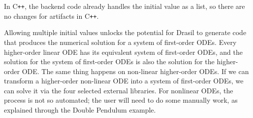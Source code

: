 In C\texttt{++}, the backend code already handles the initial value as a list, so there are no changes for artifacts in C\texttt{++}.




Allowing multiple initial values unlocks the potential for Drasil to generate code that produces the numerical solution for a system of first-order ODEs. Every higher-order linear ODE has its equivalent system of first-order ODEs, and the solution for the system of first-order ODEs is also the solution for the higher-order ODE. The same thing happens on non-linear higher-order ODEs. If we can transform a higher-order non-linear ODE into a system of first-order ODEs, we can solve it via the four selected external libraries. For nonlinear ODEs, the process is not so automated; the user will need to do some manually work, as explained through the Double Pendulum example.


